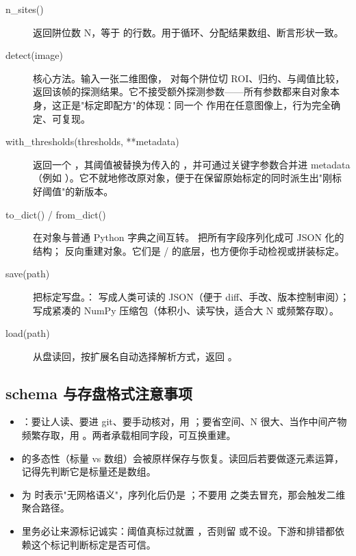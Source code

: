 \documentclass[11pt,oneside,openany]{book}
\begin{document}
\begin{description}
\item[n\_sites()] 返回阱位数 N，等于  的行数。用于循环、分配结果数组、断言形状一致。
\item[detect(image)] 核心方法。输入一张二维图像， 对每个阱位切 ROI、归约、与阈值比较，返回该帧的探测结果。它不接受额外探测参数——所有参数都来自对象本身，这正是"标定即配方"的体现：同一个  作用在任意图像上，行为完全确定、可复现。
\item[with\_thresholds(thresholds, **metadata)] 返回一个 ，其阈值被替换为传入的 ，并可通过关键字参数合并进 metadata（例如 ）。它不就地修改原对象，便于在保留原始标定的同时派生出"刚标好阈值"的新版本。
\item[to\_dict() / from\_dict()] 在对象与普通 Python 字典之间互转。 把所有字段序列化成可 JSON 化的结构； 反向重建对象。它们是 / 的底层，也方便你手动检视或拼装标定。
\item[save(path)] 把标定写盘。： 写成人类可读的 JSON（便于 diff、手改、版本控制审阅）； 写成紧凑的 NumPy 压缩包（体积小、读写快，适合大 N 或频繁存取）。
\item[load(path)] 从盘读回，按扩展名自动选择解析方式，返回 。
\end{description}

\subsection{schema 与存盘格式注意事项}

\begin{itemize}
\item {}：要让人读、要进 git、要手动核对，用 ；要省空间、N 很大、当作中间产物频繁存取，用 。两者承载相同字段，可互换重建。
\item {} 的多态性（标量 vs  数组）会被原样保存与恢复。读回后若要做逐元素运算，记得先判断它是标量还是数组。
\item {} 为  时表示"无网格语义"，序列化后仍是 ；不要用  之类去冒充，那会触发二维聚合路径。
\item {} 里务必让来源标记诚实：阈值真标过就置 ，否则留  或不设。下游和排错都依赖这个标记判断标定是否可信。
\end{itemize}
\end{document}
